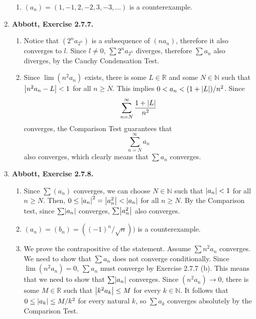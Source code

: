 \documentclass{article}
\DeclarePairedDelimiter\abs{\lvert}{\rvert}
\newcommand{\N}{\mathbb{N}}
\newcommand{\R}{\mathbb{R}}
\newcommand{\exc}[2][Abbott]{\item \textbf{#1, Exercise #2.}}
\begin{document}
\begin{enumerate}
\begin{enumerate}
        \item $(a_n) = (1,-1,2,-2,3,-3, \dots)$ is a counterexample.
    \end{enumerate}
    
    \exc{2.7.7}
    \begin{enumerate}
        \item Notice that $(2^n a_{2^n})$ is a subsequence of $(n a_n)$, therefore it also converges to $l$. Since $l \neq 0$, $\sum 2^n a_{2^n}$ diverges, therefore $\sum a_n$ also diverges, by the Cauchy Condensation Test.
        
        \item Since $\lim(n^2 a_n)$ exists, there is some $L \in \R$ and some $N \in \N$ such that $\abs*{n^2 a_n - L} < 1$ for all $n \geq N$. This implies $0 < a_n < (1+\abs*{L})/n^2$. Since 
        \begin{equation*}
            \sum_{n = N}^\infty \frac{1+\abs*{L}}{n^2}
        \end{equation*} converges, the Comparison Test guarantees that 
        \begin{equation*}
            \sum_{n = N}^\infty a_n 
        \end{equation*} also converges, which clearly means that $\sum a_n$ converges.
    \end{enumerate}
    
    \exc{2.7.8}
    \begin{enumerate}
        \item Since $\sum (a_n)$ converges, we can choose $N \in \N$ such that $\abs*{a_n} < 1$ for all $n \geq N$. Then, $0 \leq \abs*{a_n}^2 = \abs*{a_n^2} < \abs*{a_n}$ for all $n \geq N$. By the Comparison test, since $\sum \abs*{a_n}$ converges, $\sum \abs*{a_n^2}$ also converges.
        
        \item $(a_n) = (b_n) = ((-1)^n/\sqrt{n}))$ is a counterexample.
        
        \item We prove the contrapositive of the statement. Assume $\sum n^2 a_n$ converges. We need to show that $\sum a_n$ does not converge conditionally. Since $\lim (n^2 a_n) = 0$, $\sum a_n$ must converge by Exercise 2.7.7 (b). This means that we need to show that $\sum \abs*{a_n}$ converges. Since $(n^2 a_n) \to 0$, there is some $M \in \R$ such that $\abs*{k^2 a_k} \leq M$ for every $k \in \N$. It follows that $0 \leq \abs*{a_k} \leq M/k^2$ for every natural $k$, so $\sum a_k$ converges absolutely by the Comparison Test.
    \end{enumerate}
    

\end{enumerate}
\end{document}

